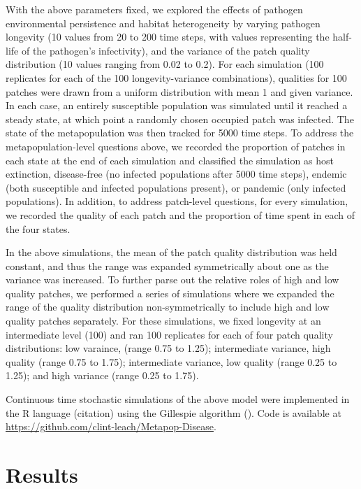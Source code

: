 \documentclass{svjour3}
\begin{document}
With the above parameters fixed, we explored the effects of pathogen environmental persistence and habitat heterogeneity by varying pathogen longevity (10 values from 20 to 200 time steps, with values representing the half-life of the pathogen's infectivity), and the variance of the patch quality distribution (10 values ranging from 0.02 to 0.2).  For each simulation (100 replicates for each of the 100 longevity-variance combinations), qualities for 100 patches were drawn from a uniform distribution with mean 1 and given variance. In each case, an entirely susceptible population was simulated until it reached a steady state, at which point a randomly chosen occupied patch was infected.  The state of the metapopulation was then tracked for 5000 time steps.  To address the metapopulation-level questions above, we recorded the proportion of patches in each state at the end of each simulation and classified the simulation as host extinction, disease-free (no infected populations after 5000 time steps), endemic (both susceptible and infected populations present), or pandemic (only infected populations).  In addition, to address patch-level questions, for every simulation, we recorded the quality of each patch and the proportion of time spent in each of the four states.  

In the above simulations, the mean of the patch quality distribution was held constant, and thus the range was expanded symmetrically about one as the variance was increased.  To further parse out the relative roles of high and low quality patches, we performed a series of simulations where we expanded the range of the quality distribution non-symmetrically to include high and low quality patches separately.  For these simulations, we fixed longevity at an intermediate level (100) and ran 100 replicates for each of four patch quality distributions: low varaince, (range 0.75 to 1.25); intermediate variance, high quality (range 0.75 to 1.75); intermediate variance, low quality (range 0.25 to 1.25); and high variance (range 0.25 to 1.75).

Continuous time stochastic simulations of the above model were implemented in the R language (citation) using the Gillespie algorithm (\cite{Gillespie1977}).  Code is available at \url{https://github.com/clint-leach/Metapop-Disease}.

\section{Results}
\label{results}
\end{document}
